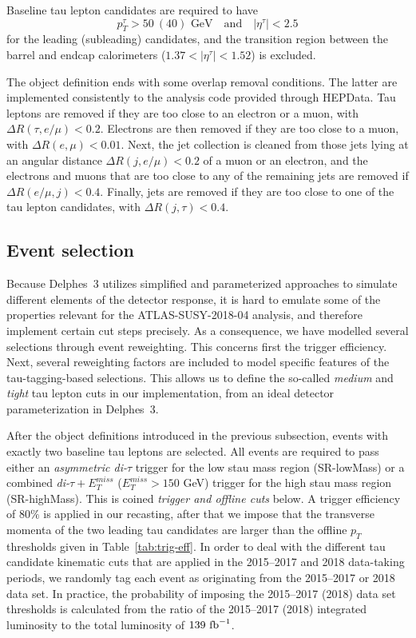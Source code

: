\documentclass{ws-mpla}
\begin{document}
Baseline tau lepton candidates are required to have 
\begin{equation}
p^{\tau}_T > 50\ (40) \textrm{ GeV}\quad \textrm{and}\quad |\eta^{\tau}| < 2.5
\end{equation}
for the leading (subleading) candidates, and the transition region between the barrel and endcap calorimeters ($ 1.37 < |\eta^{\tau}| < 1.52 $) is excluded.

The object definition ends with some overlap removal conditions. The latter are implemented consistently to the analysis code provided through HEPData\cite{hepdata}.
Tau leptons are removed if they are too close to an electron or a muon, with $\Delta R(\tau,e/\mu) < 0.2$. Electrons are then removed if they are too close to a muon, with $\Delta R(e,\mu) < 0.01$. Next, the jet collection is cleaned from those jets lying at an angular distance $\Delta R(j,e/\mu) < 0.2$ of a muon or an electron, and the electrons and muons that are too close to any of the remaining jets are removed if $\Delta R(e/\mu,j) < 0.4$. Finally, jets are removed if they are too close to one of the tau lepton candidates, with $\Delta R(j,\tau) < 0.4$.


\subsection{Event selection}\label{sec:selection}
Because {\sc Delphes}~3 utilizes simplified and parameterized approaches to simulate different elements of the detector response, it is hard to emulate some of the properties relevant for the ATLAS-SUSY-2018-04 analysis, and therefore implement certain cut steps precisely. As a consequence, we have modelled several selections through event reweighting. This concerns first the trigger efficiency. Next, several reweighting factors are included to model specific features of the tau-tagging-based selections. This allows us to define the so-called \textit{medium} and \textit{tight} tau lepton cuts in our implementation, from an ideal detector parameterization in {\sc Delphes}~3.

After the object definitions introduced in the previous subsection, events with exactly two baseline tau leptons are selected.
All events are required to pass either an \textit{asymmetric di-$\tau$} trigger for the low stau mass region (SR-lowMass) or a combined \textit{di-$\tau +E^{miss}_T$} ($E^{miss}_T > 150$ GeV) trigger for the high stau mass region (SR-highMass). This is coined \textit{trigger and offline cuts} below.
A trigger efficiency of $80\%$ is applied in our recasting, after that we impose that the transverse momenta of the two leading tau candidates are larger than the offline $p_T$ thresholds given in Table~\ref{tab:trig-eff}.
In order to deal with the different tau candidate kinematic cuts that are applied in the 2015--2017 and 2018 data-taking periods, we randomly tag each event as originating from the 2015--2017 or 2018 data set. In practice, the probability of imposing the 2015--2017 (2018) data set thresholds is calculated from the ratio of the 2015--2017 (2018) integrated luminosity to the total luminosity of $139~{\rm fb}^{-1}$.
\end{document}
